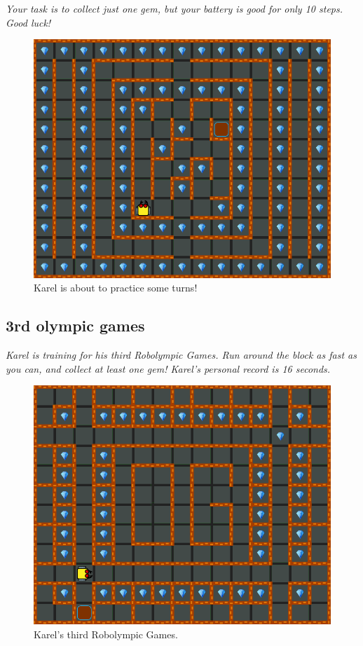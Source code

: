 {\em Your task is to collect just one gem, but your battery is good for only 10 steps. Good luck!}

\begin{figure}[!ht]
\begin{center}
\includegraphics[height=0.4\textwidth]{img/a05.png}
\end{center}
\vspace{-4mm}
\caption{Karel is about to practice some turns!}
\label{fig:a05}
\vspace{-1cm}
\end{figure}
\noindent


\subsection{3rd olympic games}

{\em Karel is training for his third Robolympic Games. Run around the block as fast as you can, and collect at least one gem! Karel's personal record is 16 seconds.}

\begin{figure}[!ht]
\begin{center}
\includegraphics[height=0.4\textwidth]{img/a06.png}
\end{center}
\vspace{-4mm}
\caption{Karel's third Robolympic Games.}
\label{fig:a06}
\vspace{-1cm}
\end{figure}
\noindent


